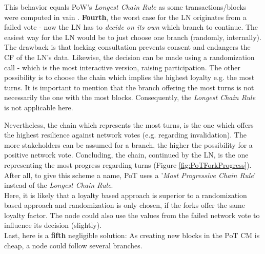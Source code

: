 This behavior equals \gls{PoW}'s \textit{Longest Chain Rule} \cite[2]{Ewerhart.2020}
as some transactions/blocks were computed in vain \cite[3-4]{FinlowBatesK..2017}.
\textbf{Fourth}, the worst case for the \gls{LN} originates from a failed vote - now
the \gls{LN} has to \textit{decide on its own} which branch to continue.
The easiest way for the \gls{LN} would be to just choose one branch (randomly, internally).
The drawback is that lacking consultation prevents consent and endangers the \gls{CF} of the \gls{LN}'s data.
Likewise, the decision can be made using a randomization call - which is the most interactive version, raising participation.
The other possibility is to choose the chain which implies the highest loyalty e.g. the most turns.
It is important to mention that the branch offering the most turns is not necessarily the one with the most blocks.
Consequently, the \textit{Longest Chain Rule} is not applicable here.
\begin{figure} [!b]
\end{figure}
Nevertheless, the chain which represents the most turns, is the one which offers the highest resilience against network votes (e.g. regarding invalidation).
The more stakeholders can be assumed for a branch, the higher the possibility for a positive network vote.
Concluding, the chain, continued by the \gls{LN}, is the one representing the most progress regarding turns (Figure \ref{fig:PoTForkProgress}).
After all, to give this scheme a name, \gls{PoT} uses a '\textit{Most Progressive Chain Rule}' instead of the \textit{Longest Chain Rule}. \\
Here, it is likely that a loyalty based approach is superior to a randomization based approach and randomization is only chosen, if the forks offer the same loyalty factor.
The node could also use the values from the failed network vote to influence its decision (slightly). \\
Last, here is a \textbf{fifth} negligible solution:
As creating new blocks in the \gls{PoT} \gls{CM} is cheap, a node could follow several branches.
